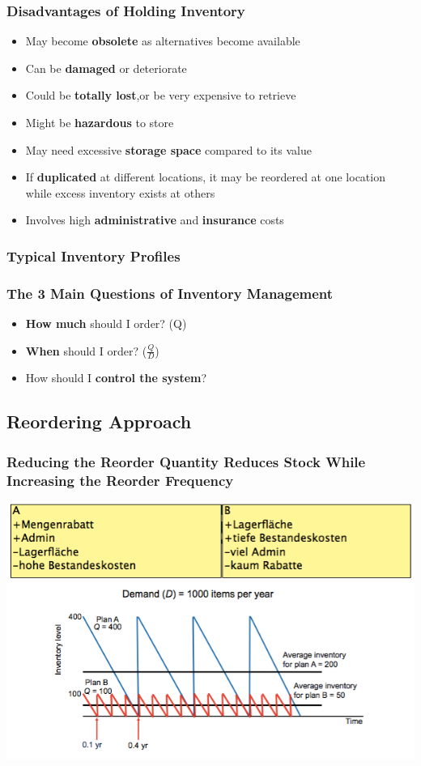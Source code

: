 \subsubsection{Disadvantages of Holding Inventory}
\begin{itemize}
	\item May become \textbf{obsolete} as alternatives become available
	\item Can be \textbf{damaged} or deteriorate
	\item Could be \textbf{totally lost},or be very expensive
	to retrieve
	\item Might be \textbf{hazardous} to store
	\item May need excessive \textbf{storage space} compared to its value
	\item If \textbf{duplicated} at different locations, it may be reordered at one
	location while excess inventory exists at others
	\item Involves high \textbf{administrative} and \textbf{insurance} costs
\end{itemize}
\subsubsection{Typical Inventory Profiles}
\subsubsection{The 3 Main Questions of Inventory Management}
\begin{itemize}
	\item \textbf{How much} should I order? (Q)
	\item \textbf{When} should I order? ($\frac{Q}{D}$)
	\item How should I \textbf{control the system}?
\end{itemize}
\subsection{Reordering Approach}
\subsubsection{Reducing the Reorder Quantity Reduces Stock While Increasing the Reorder Frequency}
\includegraphics[width=1\textwidth]{W10/reducingreorder}
